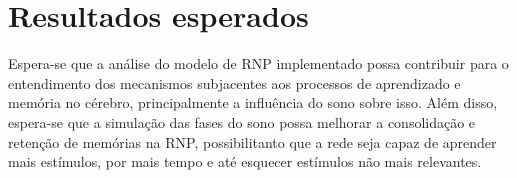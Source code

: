 \section{Resultados esperados}

Espera-se que a análise do modelo de RNP implementado possa contribuir para o entendimento dos mecanismos subjacentes aos
processos de aprendizado e memória no cérebro, principalmente a influência do sono sobre isso. Além disso, espera-se que a
simulação das fases do sono possa melhorar a consolidação e retenção de memórias na RNP, possibilitanto que a rede seja capaz de
aprender mais estímulos, por mais tempo e até esquecer estímulos não mais relevantes.
